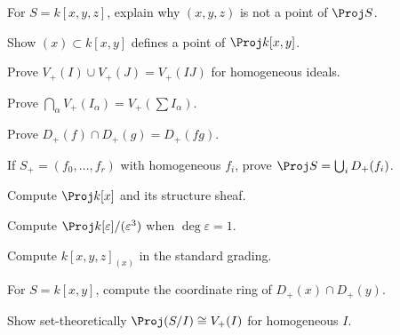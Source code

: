 \begin{exercise}\label{exr:vi35-01}
For \(S=k[x,y,z]\), explain why \((x,y,z)\) is not a point of \(\Proj S\).
\end{exercise}

\begin{exercise}\label{exr:vi35-02}
Show \((x)\subset k[x,y]\) defines a point of \(\Proj k[x,y]\).
\end{exercise}

\begin{exercise}\label{exr:vi35-03}
Prove \(V_+(I)\cup V_+(J)=V_+(IJ)\) for homogeneous ideals.
\end{exercise}

\begin{exercise}\label{exr:vi35-04}
Prove \(\bigcap_\alpha V_+(I_\alpha)=V_+(\sum I_\alpha)\).
\end{exercise}

\begin{exercise}\label{exr:vi35-05}
Prove \(D_+(f)\cap D_+(g)=D_+(fg)\).
\end{exercise}

\begin{exercise}\label{exr:vi35-06}
If \(S_+=(f_0,\ldots,f_r)\) with homogeneous \(f_i\), prove \(\Proj S=\bigcup_iD_+(f_i)\).
\end{exercise}

\begin{exercise}\label{exr:vi35-07}
Compute \(\Proj k[x]\) and its structure sheaf.
\end{exercise}

\begin{exercise}\label{exr:vi35-08}
Compute \(\Proj k[\varepsilon]/(\varepsilon^3)\) when \(\deg\varepsilon=1\).
\end{exercise}

\begin{exercise}\label{exr:vi35-09}
Compute \(k[x,y,z]_{(x)}\) in the standard grading.
\end{exercise}

\begin{exercise}\label{exr:vi35-10}
For \(S=k[x,y]\), compute the coordinate ring of \(D_+(x)\cap D_+(y)\).
\end{exercise}

\begin{exercise}\label{exr:vi35-11}
Show set-theoretically \(\Proj(S/I)\cong V_+(I)\) for homogeneous \(I\).
\end{exercise}

